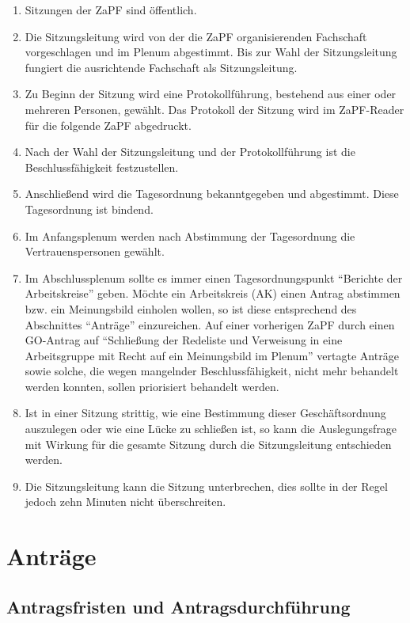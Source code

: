\documentclass[
  a4paper,
  oneside]{scrartcl}
\providecommand{\tightlist}{%
  \setlength{\itemsep}{0pt}\setlength{\parskip}{0pt}}
\begin{document}
\begin{enumerate}
\def\labelenumi{\arabic{enumi}.}
\tightlist
\item
  Sitzungen der ZaPF sind öffentlich.
\item
  Die Sitzungsleitung wird von der die ZaPF organisierenden Fachschaft
  vorgeschlagen und im Plenum abgestimmt. Bis zur Wahl der
  Sitzungsleitung fungiert die ausrichtende Fachschaft als
  Sitzungsleitung.
\item
  Zu Beginn der Sitzung wird eine Protokollführung, bestehend aus einer
  oder mehreren Personen, gewählt. Das Protokoll der Sitzung wird im
  ZaPF-Reader für die folgende ZaPF abgedruckt.
\item
  Nach der Wahl der Sitzungsleitung und der Protokollführung ist die
  Beschlussfähigkeit festzustellen.
\item
  Anschließend wird die Tagesordnung bekanntgegeben und abgestimmt.
  Diese Tagesordnung ist bindend.
\item
  Im Anfangsplenum werden nach Abstimmung der Tagesordnung die
  Vertrauenspersonen gewählt.
\item
  Im Abschlussplenum sollte es immer einen Tagesordnungspunkt ``Berichte
  der Arbeitskreise'' geben. Möchte ein Arbeitskreis (AK) einen Antrag
  abstimmen bzw. ein Meinungsbild einholen wollen, so ist diese
  entsprechend des Abschnittes ``Anträge'' einzureichen. Auf einer
  vorherigen ZaPF durch einen GO-Antrag auf ``Schließung der Redeliste
  und Verweisung in eine Arbeitsgruppe mit Recht auf ein Meinungsbild im
  Plenum'' vertagte Anträge sowie solche, die wegen mangelnder
  Beschlussfähigkeit, nicht mehr behandelt werden konnten, sollen
  priorisiert behandelt werden.
\item
  Ist in einer Sitzung strittig, wie eine Bestimmung dieser
  Geschäftsordnung auszulegen oder wie eine Lücke zu schließen ist, so
  kann die Auslegungsfrage mit Wirkung für die gesamte Sitzung durch die
  Sitzungsleitung entschieden werden.
\item
  Die Sitzungsleitung kann die Sitzung unterbrechen, dies sollte in der
  Regel jedoch zehn Minuten nicht überschreiten.
\end{enumerate}

\section{Anträge}\label{antruxe4ge}

\subsection{Antragsfristen und
Antragsdurchführung}\label{antragsfristen-und-antragsdurchfuxfchrung}
\end{document}
